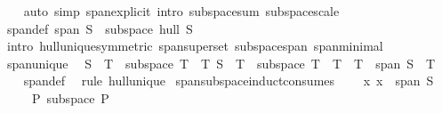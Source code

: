 \begin{isabellebody}
%
\isadelimproof
\ \ %
\endisadelimproof
%
\isatagproof
{}\isamarkupfalse%
\ {\isacharparenleft}{\kern0pt}auto\ simp{\isacharcolon}{\kern0pt}\ span{\isacharunderscore}{\kern0pt}explicit\ intro{\isacharbang}{\kern0pt}{\isacharcolon}{\kern0pt}\ subspace{\isacharunderscore}{\kern0pt}sum\ subspace{\isacharunderscore}{\kern0pt}scale{\isacharparenright}{\kern0pt}%
\endisatagproof
{\isafoldproof}%
%
\isadelimproof
\isanewline
%
\endisadelimproof
\isanewline
{}\isamarkupfalse%
\ span{\isacharunderscore}{\kern0pt}def{\isacharcolon}{\kern0pt}\ {\isachardoublequoteopen}span\ S\ {\isacharequal}{\kern0pt}\ subspace\ hull\ S{\isachardoublequoteclose}\ \isanewline
%
\isadelimproof
\ \ %
\endisadelimproof
%
\isatagproof
{}\isamarkupfalse%
\ {\isacharparenleft}{\kern0pt}intro\ hull{\isacharunderscore}{\kern0pt}unique{\isacharbrackleft}{\kern0pt}symmetric{\isacharbrackright}{\kern0pt}\ span{\isacharunderscore}{\kern0pt}superset\ subspace{\isacharunderscore}{\kern0pt}span\ span{\isacharunderscore}{\kern0pt}minimal{\isacharparenright}{\kern0pt}%
\endisatagproof
{\isafoldproof}%
%
\isadelimproof
\isanewline
%
\endisadelimproof
\isanewline
{}\isamarkupfalse%
\ span{\isacharunderscore}{\kern0pt}unique{\isacharcolon}{\kern0pt}\isanewline
\ \ {\isachardoublequoteopen}S\ {\isasymsubseteq}\ T\ {\isasymLongrightarrow}\ subspace\ T\ {\isasymLongrightarrow}\ {\isacharparenleft}{\kern0pt}{\isasymAnd}T{\isacharprime}{\kern0pt}{\isachardot}{\kern0pt}\ S\ {\isasymsubseteq}\ T{\isacharprime}{\kern0pt}\ {\isasymLongrightarrow}\ subspace\ T{\isacharprime}{\kern0pt}\ {\isasymLongrightarrow}\ T\ {\isasymsubseteq}\ T{\isacharprime}{\kern0pt}{\isacharparenright}{\kern0pt}\ {\isasymLongrightarrow}\ span\ S\ {\isacharequal}{\kern0pt}\ T{\isachardoublequoteclose}\isanewline
%
\isadelimproof
\ \ %
\endisadelimproof
%
\isatagproof
{}\isamarkupfalse%
\ span{\isacharunderscore}{\kern0pt}def\ \isamarkupfalse%
\ {\isacharparenleft}{\kern0pt}rule\ hull{\isacharunderscore}{\kern0pt}unique{\isacharparenright}{\kern0pt}%
\endisatagproof
{\isafoldproof}%
%
\isadelimproof
\isanewline
%
\endisadelimproof
\isanewline
{}\isamarkupfalse%
\ span{\isacharunderscore}{\kern0pt}subspace{\isacharunderscore}{\kern0pt}induct{\isacharbrackleft}{\kern0pt}consumes\ {}{\isacharbrackright}{\kern0pt}{\isacharcolon}{\kern0pt}\isanewline
\ \ \ x{\isacharcolon}{\kern0pt}\ {\isachardoublequoteopen}x\ {\isasymin}\ span\ S{\isachardoublequoteclose}\isanewline
\ \ \ \ \ P{\isacharcolon}{\kern0pt}\ {\isachardoublequoteopen}subspace\ P{\isachardoublequoteclose}\isanewline

\end{isabellebody}
